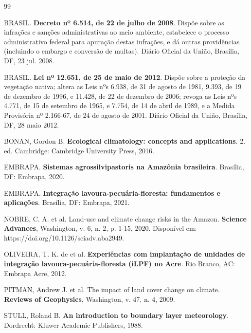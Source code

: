 \documentclass[12pt,a4paper]{article}
\begin{document}
\vspace{1cm}
\renewcommand{\refname}{Referências Bibliográficas}
\begin{thebibliography}{99}

 BRASIL. \textbf{Decreto nº 6.514, de 22 de julho de 2008}. Dispõe sobre as infrações e sanções administrativas ao meio ambiente, estabelece o processo administrativo federal para apuração destas infrações, e dá outras providências (incluindo o embargo e conversão de multas). Diário Oficial da União, Brasília, DF, 23 jul. 2008.

 BRASIL. \textbf{Lei nº 12.651, de 25 de maio de 2012}. Dispõe sobre a proteção da vegetação nativa; altera as Leis nºs 6.938, de 31 de agosto de 1981, 9.393, de 19 de dezembro de 1996, e 11.428, de 22 de dezembro de 2006; revoga as Leis nºs 4.771, de 15 de setembro de 1965, e 7.754, de 14 de abril de 1989, e a Medida Provisória nº 2.166-67, de 24 de agosto de 2001. Diário Oficial da União, Brasília, DF, 28 maio 2012.

 BONAN, Gordon B. \textbf{Ecological climatology: concepts and applications}. 2. ed. Cambridge: Cambridge University Press, 2016.

 EMBRAPA. \textbf{Sistemas agrossilvipastoris na Amazônia brasileira}. Brasília, DF: Embrapa, 2020.

 EMBRAPA. \textbf{Integração lavoura-pecuária-floresta: fundamentos e aplicações}. Brasília, DF: Embrapa, 2021.

 NOBRE, C. A. et al. Land-use and climate change risks in the Amazon. \textbf{Science Advances}, Washington, v. 6, n. 2, p. 1-15, 2020. Disponível em: https://doi.org/10.1126/sciadv.aba2949.

 OLIVEIRA, T. K. de et al. \textbf{Experiências com implantação de unidades de integração lavoura-pecuária-floresta (iLPF) no Acre}. Rio Branco, AC: Embrapa Acre, 2012.

 PITMAN, Andrew J. et al. The impact of land cover change on climate. \textbf{Reviews of Geophysics}, Washington, v. 47, n. 4, 2009.

 STULL, Roland B. \textbf{An introduction to boundary layer meteorology}. Dordrecht: Kluwer Academic Publishers, 1988.

\end{thebibliography}
\end{document}
